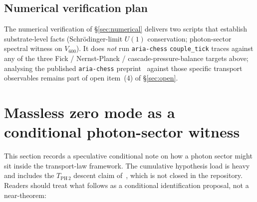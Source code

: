 \documentclass[11pt]{article}
\theoremstyle{definition}
\begin{document}
\subsection{Numerical verification plan}

The numerical verification of \S\ref{sec:numerical} delivers two scripts that establish substrate-level facts (Schr\"{o}dinger-limit $U(1)$ conservation; photon-sector spectral witness on $V_{600}$). It does \emph{not} run \texttt{aria-chess} \texttt{couple\_tick} traces against any of the three Fick / Nernst-Planck / cascade-pressure-balance targets above; analysing the published \texttt{aria-chess} preprint~\citep{SmartARIAChess2026} against those specific transport observables remains part of open item~(4) of \S\ref{sec:open}.

\section{Massless zero mode as a conditional photon-sector witness}\label{sec:photon}

This section records a speculative conditional note on how a photon sector might sit inside the transport-law framework. The cumulative hypothesis load is heavy and includes the $T_{\text{PH}\,2}$ descent claim of~\citep{CascadeAlphaChain}, which is not closed in the repository. Readers should treat what follows as a conditional identification proposal, not a near-theorem:
\end{document}
